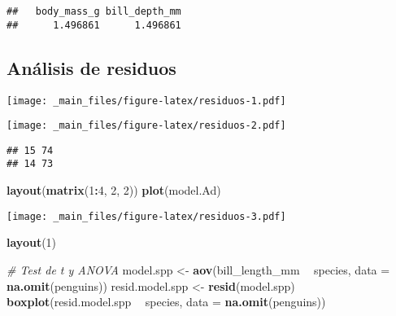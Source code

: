 \documentclass[
]{book}
\newenvironment{Shaded}{\begin{snugshade}}{\end{snugshade}}
\newcommand{\CommentTok}[1]{\textcolor[rgb]{0.56,0.35,0.01}{\textit{#1}}}
\newcommand{\DataTypeTok}[1]{\textcolor[rgb]{0.13,0.29,0.53}{#1}}
\newcommand{\DecValTok}[1]{\textcolor[rgb]{0.00,0.00,0.81}{#1}}
\newcommand{\KeywordTok}[1]{\textcolor[rgb]{0.13,0.29,0.53}{\textbf{#1}}}
\newcommand{\NormalTok}[1]{#1}
\newcommand{\OperatorTok}[1]{\textcolor[rgb]{0.81,0.36,0.00}{\textbf{#1}}}
\newcommand{\StringTok}[1]{\textcolor[rgb]{0.31,0.60,0.02}{#1}}
\begin{document}
\begin{verbatim}
##   body_mass_g bill_depth_mm 
##      1.496861      1.496861
\end{verbatim}

\hypertarget{anuxe1lisis-de-residuos}{%
\subsection{Análisis de residuos}\label{anuxe1lisis-de-residuos}}

\begin{Shaded}
\end{Shaded}

\texttt{[image: \_main\_files/figure-latex/residuos-1.pdf]}

\begin{Shaded}
\end{Shaded}

\texttt{[image: \_main\_files/figure-latex/residuos-2.pdf]}

\begin{verbatim}
## 15 74 
## 14 73
\end{verbatim}

\begin{Shaded}
\begin{Highlighting}[]
\KeywordTok{layout}\NormalTok{(}\KeywordTok{matrix}\NormalTok{(}\DecValTok{1}\OperatorTok{:}\DecValTok{4}\NormalTok{, }\DecValTok{2}\NormalTok{, }\DecValTok{2}\NormalTok{))}
\KeywordTok{plot}\NormalTok{(model.Ad)}
\end{Highlighting}
\end{Shaded}

\texttt{[image: \_main\_files/figure-latex/residuos-3.pdf]}

\begin{Shaded}
\begin{Highlighting}[]
\KeywordTok{layout}\NormalTok{(}\DecValTok{1}\NormalTok{)}

\CommentTok{# Test de t y ANOVA}
\NormalTok{model.spp <-}\StringTok{ }\KeywordTok{aov}\NormalTok{(bill_length_mm }\OperatorTok{~}\StringTok{ }\NormalTok{species, }\DataTypeTok{data =} \KeywordTok{na.omit}\NormalTok{(penguins))}
\NormalTok{resid.model.spp <-}\StringTok{ }\KeywordTok{resid}\NormalTok{(model.spp)}
\KeywordTok{boxplot}\NormalTok{(resid.model.spp }\OperatorTok{~}\StringTok{ }\NormalTok{species, }\DataTypeTok{data =} \KeywordTok{na.omit}\NormalTok{(penguins)) }
\end{Highlighting}
\end{Shaded}
\end{document}
